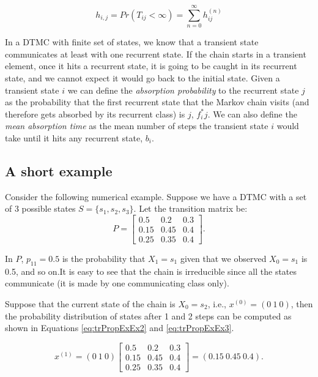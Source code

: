 \documentclass[
  nojss]{jss}
\begin{document}
\begin{equation}
h_{i,j} = Pr(T_{ij} < \infty) = \sum_{n = 0}^{\infty} h_{ij}^{(n)}
\label{eq:hitting-probs}
\end{equation}

In a DTMC with finite set of states, we know that a transient state communicates at least with one recurrent state. If the chain starts in a transient element, once it hits a recurrent state, it is going to be caught in its recurrent state, and we cannot expect it would go back to the initial state. Given a transient state \(i\) we can define the \emph{absorption probability} to the recurrent state \(j\) as the probability that the first recurrent state that the Markov chain visits (and therefore gets absorbed by its recurrent class) is \(j\), \(f^{*}_ij\). We can also define the \emph{mean absorption time} as the mean number of steps the transient state \(i\) would take until it hits any recurrent state, \(b_i\).

\hypertarget{a-short-example}{%
\subsection{A short example}\label{a-short-example}}

Consider the following numerical example. Suppose we have a DTMC with a set of 3 possible states \(S=\{s_{1}, s_{2}, s_{3}\}\). Let the transition matrix be:
\begin{equation}
P=\left[\begin{array}{ccc}
0.5 & 0.2 & 0.3\\
0.15 & 0.45 & 0.4\\
0.25 & 0.35 & 0.4
\end{array}\right].
\label{eq:trPropExEx1}
\end{equation}

In \(P\), \(p_{11}=0.5\) is the probability that \(X_{1}=s_{1}\) given that we observed \(X_{0}=s_{1}\) is 0.5, and so on.It is easy to see that the chain is irreducible since all the states communicate (it is made by one communicating class only).

Suppose that the current state of the chain is \(X_{0}=s_{2}\), i.e., \(x^{(0)}=(0\:1\:0)\), then the probability distribution of states after 1 and 2 steps can be computed as shown in Equations \eqref{eq:trPropExEx2} and \eqref{eq:trPropExEx3}.

\begin{equation}
x^{(1)}=\left(0\:1\:0\right)\left[\begin{array}{ccc}
0.5 & 0.2 & 0.3\\
0.15 & 0.45 & 0.4\\
0.25 & 0.35 & 0.4
\end{array}\right]=\left(0.15\:0.45\:0.4\right).
\label{eq:trPropExEx2}
\end{equation}
\end{document}
